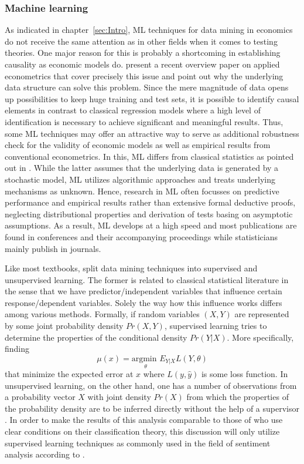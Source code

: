 \subsubsection{Machine learning} %

As indicated in chapter~\ref{sec:Intro}, ML techniques for data mining in economics do not receive the same attention as in other fields when it comes to testing theories. One major reason for this is probably a shortcoming in establishing causality as economic models do. \textcite{Athey.2017} present a recent overview paper on applied econometrics that cover precisely this issue and point out why the underlying data structure can solve this problem. Since the mere magnitude of data opens up possibilities to keep huge training and test sets, it is possible to identify causal elements in contrast to classical regression models where a high level of identification is necessary to achieve significant and meaningful results. Thus, some ML techniques may offer an attractive way to serve as additional robustness check for the validity of economic models as well as empirical results from conventional econometrics. In this, ML differs from classical statistics as pointed out in \textcite{Breiman.2001}. While the latter assumes that the underlying data is generated by a stochastic model, ML utilizes algorithmic approaches and treats underlying mechanisms as unknown. Hence, research in ML often focusses on predictive performance and empirical results rather than extensive formal deductive proofs, neglecting distributional properties and derivation of tests basing on asymptotic assumptions. As a result, ML develops at a high speed and most publications are found in conferences and their accompanying proceedings while statisticians mainly publish in journals. 

Like most textbooks, \textcite{Friedman.2001} split data mining techniques into supervised and unsupervised learning. The former is related to classical statistical literature in the sense that we have predictor/independent variables that influence certain response/dependent variables. Solely the way how this influence works differs among various methods. Formally, if random variables $(X,Y)$ are represented by some joint probability density $Pr(X,Y)$, supervised learning tries to determine the properties of the conditional density $Pr(Y|X) $. More specifically, finding 
%
\begin{equation*}
	\mu(x) = \underset{\theta}{\text{argmin }} E_{Y|X} L(Y,\theta)
\end{equation*}
%
that minimize the expected error at $x$ where $L(y,\hat{y})$ is some loss function. In unsupervised learning, on the other hand, one has a number of observations from a probability vector $X$ with joint density $Pr(X)$ from which the properties of the probability density are to be inferred directly without the help of a supervisor \parencite[pp.~485-486]{Friedman.2001}. In order to make the results of this analysis comparable to those of \textcite{Ellingsen.2003} who use clear conditions on their classification theory, this discussion will only utilize supervised learning techniques as commonly used in the field of sentiment analysis according to \textcite{Wiebe.1999}. 

